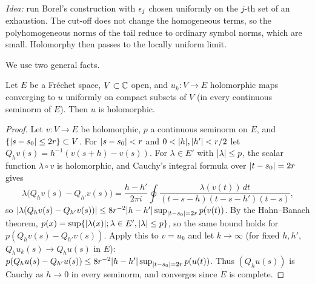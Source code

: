 \subsection*{}

\emph{Idea:} run Borel's construction with $\epsilon_j$ chosen uniformly on the $j$-th set of
an exhaustion. The cut-off does not change the homogeneous terms, so the polyhomogeneous
norms of the tail reduce to ordinary symbol norms, which are small. Holomorphy then passes
to the locally uniform limit.

We use two general facts.

\begin{lemma}\label{soleuclidean:lem:hol-limit}
  Let $E$ be a Fr\'echet space, $V\subset\mathbb{C}$ open, and $u_k:V\to E$ holomorphic maps
  converging to $u$ uniformly on compact subsets of $V$ \textup{(}in every continuous
  seminorm of $E$\textup{)}. Then $u$ is holomorphic.
\end{lemma}
\begin{proof}
  Let $v:V\to E$ be holomorphic, $p$ a continuous seminorm on $E$, and
  $\{\lvert s-s_0\rvert\le2r\}\subset V$. For $\lvert s-s_0\rvert<r$ and $0<\lvert h\rvert,\lvert h'\rvert<r/2$ let
  $Q_hv(s)=h^{-1}(v(s+h)-v(s))$. For $\lambda\in E'$ with $\lvert \lambda\rvert\le p$, the scalar
  function $\lambda\circ v$ is holomorphic, and Cauchy's integral formula over
  $\lvert t-s_0\rvert=2r$ gives
  \begin{equation*}
    \lambda\bigl(Q_hv(s)-Q_{h'}v(s)\bigr)=\frac{h-h'}{2\pi i}\oint
    \frac{\lambda(v(t))\,dt}{(t-s-h)(t-s-h')(t-s)},
  \end{equation*}
  so $\lvert \lambda(Q_hv(s)-Q_{h'}v(s))\rvert\le8r^{-2}\lvert h-h'\rvert\sup_{\lvert t-s_0\rvert=2r}p(v(t))$. By
  the Hahn--Banach theorem, $p(x)=\sup\{\lvert \lambda(x)\rvert;\lambda\in E',\lvert \lambda\rvert\le p\}$,
  so the same bound holds for $p(Q_hv(s)-Q_{h'}v(s))$. Apply this to $v=u_k$ and let
  $k\to\infty$ (for fixed $h,h'$, $Q_hu_k(s)\to Q_hu(s)$ in $E$):
  $p(Q_hu(s)-Q_{h'}u(s))\le8r^{-2}\lvert h-h'\rvert\sup_{\lvert t-s_0\rvert=2r}p(u(t))$. Thus
  $(Q_hu(s))$ is Cauchy as $h\to0$ in every seminorm, and converges since $E$ is
  complete.
\end{proof}

